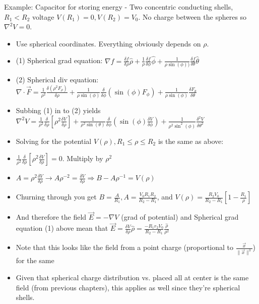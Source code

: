 \documentclass[11pt, oneside]{article}   	%
\begin{document}
Example: Capacitor for storing energy - Two concentric conducting shells, $R_1 < R_2$ voltage $V(R_1) = 0, V(R_2) = V_0$.  No charge between the spheres so $\nabla^2V = 0$.
\begin{itemize}
\item Use spherical coordinates.  Everything obviously depends on $\rho$.  
\item (1) Spherical grad equation: $\nabla f = \frac{\delta f}{\delta \rho} \hat{\rho} +   \frac{1}{\rho} \frac{\delta f}{\delta \phi} \hat{\phi} +  \frac{1}{\rho\sin(\phi))}\frac{\delta f}{\delta \theta} \hat{\theta}$
\item (2) Spherical div equation: $\nabla \cdot \vec{F} = \frac{1}{\rho^2}\frac{\delta (\rho^2F_{\rho})}{\delta \rho}  +   \frac{1}{\rho \sin(\phi)} \frac{\delta}{\delta \phi} (\sin(\phi) F_{\phi}) +  \frac{1}{\rho\sin(\phi)}\frac{\delta F_{\theta}}{\delta \theta} $
\item Subbing (1) in to (2) yields $\nabla^2V = \frac{1}{\rho^2}\frac{\delta}{\delta \rho}[\rho^2\frac{\delta V}{\delta \rho}] + \frac{1}{\rho^2\sin(\theta)}  \frac{\delta}{\delta \phi} (\sin(\phi)\frac{\delta V}{\delta \phi})  + \frac{1}{\rho^2\sin^2(\phi)}\frac{\delta ^2V}{\delta \theta^2}$
\item Solving for the potential $V(\rho), R_1 \leq \rho \leq R_2$ is the same as above:
\item $\frac{1}{\rho^2}\frac{\delta}{\delta \rho}[\rho^2\frac{\delta V}{\delta \rho}] = 0$.  Multiply by $\rho^2$
\item $A = \rho^2 \frac{\delta V}{\delta \rho} \rightarrow A\rho^{-2}= \frac{\delta V}{\delta \rho} \Rightarrow B - A\rho^{-1} = V(\rho)$
\item Churning through you get $B = \frac{A}{R_1}, A = \frac{V_0R_1R_2} {R_2-R_1}$, and $V(\rho) = \frac{R_2V_0}{R_2-R_1}[1 - \frac{R_1}{\rho}]$
\item And therefore the field $\vec{E} = - \nabla V$ (grad of potential) and Spherical grad equation (1) above mean that $\vec{E} = \frac{\delta V}{\delta \rho}\hat{\rho} = \frac{-R_1r_2V_0}{R_2-R_1}\frac{\hat{\rho}}{\rho^2}$
\item Note that this looks like the field from a point charge (proportional to $\frac{\vec{x}}{\|\vec{x}\|^3}$) for the same 
\item Given that spherical charge distribution vs. placed all at center is the same field (from previous chapters), this applies as well since they're spherical shells. 
\end{itemize}
\end{document}
